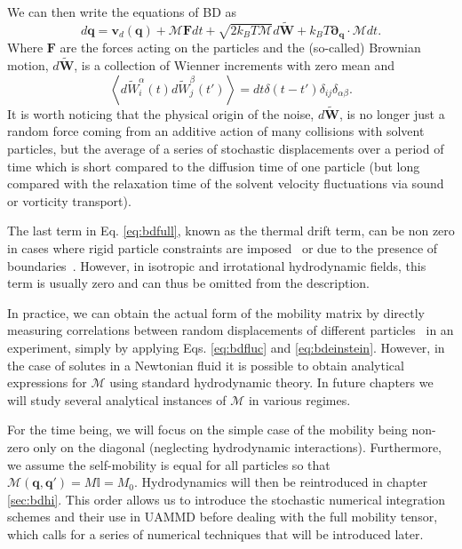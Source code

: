 \documentclass[twoside,openright,titlepage,numbers=noenddot,%
headinclude,footinclude,cleardoublepage=empty,abstract=on,
BCOR=5mm,fontsize=11pt, dvipsnames, paper=b5
]{scrreprt}
\renewcommand{\vec}[1]{\bm{#1}}
\newcommand{\tens}[1]{\bm{\mathcal{#1}}}
\newcommand{\uammd}{\gls{UAMMD}\xspace}
\newcommand{\kT}{k_B T}
\newcommand{\noise}{\widetilde{W}}
\newcommand{\ppos}{q}
\begin{document}
We can then write the equations of \gls{BD} as
\begin{equation}
  \label{eq:bdfull}
  d\vec{\ppos} = \vec{v}_d(\vec{\ppos}) + \tens{M}\vec{F}dt + \sqrt{2\kT\tens{M}}d\vec{\noise} + \kT\vec{\partial}_{\vec{\ppos}}\cdot\tens{M}dt.
\end{equation}
Where $\vec{F}$ are the forces acting on the particles and the (so-called) Brownian motion, $d\vec{\noise}$, is a collection of Wienner increments with zero mean and
\begin{equation}
\left\langle d\noise_{i}^\alpha(t)d\noise_{j}^\beta(t') \right\rangle = dt\delta(t-t')\delta_{ij}\delta_{\alpha\beta}.
\end{equation}
It is worth noticing that the physical origin of the noise, $d\vec{\noise}$, is no longer just a random force coming from an additive action of many collisions with solvent particles, but the average of a series of stochastic displacements over a period of time which is short compared to the diffusion time of one particle (but long compared with the relaxation time of the solvent velocity fluctuations via sound or vorticity transport).

The last term in Eq. \eqref{eq:bdfull}, known as the thermal drift term, can be non zero in cases where rigid particle constraints are imposed~\cite{Westwood2021} or due to the presence of boundaries~\cite{Pelaez2018,Balboa2016}. However, in isotropic and irrotational hydrodynamic fields, this term is usually zero and can thus be omitted from the description.

In practice, we can obtain the actual form of the mobility matrix by directly measuring correlations between random displacements of different particles~\cite{Panzuela2018} in an experiment, simply by applying Eqs. \eqref{eq:bdfluc} and \eqref{eq:bdeinstein}. However, in the case of solutes in a Newtonian fluid it is possible to obtain analytical expressions for $\tens{M}$ using standard hydrodynamic theory. In future chapters we will study several analytical instances of $\tens{M}$ in various regimes.

For the time being, we will focus on the simple case of the mobility being non-zero only on the diagonal (neglecting hydrodynamic interactions). Furthermore, we assume the self-mobility is equal for all particles so that $\tens{M}(\vec{\ppos}, \vec{\ppos}') = M\mathbb{I} = M_0$. Hydrodynamics will then be reintroduced in chapter \ref{sec:bdhi}. This order allows us to introduce the stochastic numerical integration schemes and their use in \uammd before dealing with the full mobility tensor, which calls for a series of numerical techniques that will be introduced later.
\end{document}
